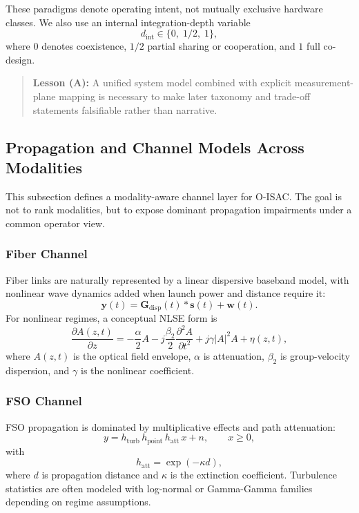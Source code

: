 These paradigms denote operating intent, not mutually exclusive hardware classes. We also use an internal integration-depth variable
\begin{equation}
d_{\text{int}}\in\{0,\;1/2,\;1\},
\end{equation}
where $0$ denotes coexistence, $1/2$ partial sharing or cooperation, and $1$ full co-design.

\begin{quote}
\textbf{Lesson (A):} A unified system model combined with explicit measurement-plane mapping is necessary to make later taxonomy and trade-off statements falsifiable rather than narrative.
\end{quote}

\subsection{Propagation and Channel Models Across Modalities}
This subsection defines a modality-aware channel layer for O-ISAC. The goal is not to rank modalities, but to expose dominant propagation impairments under a common operator view.

\subsubsection{Fiber Channel}
Fiber links are naturally represented by a linear dispersive baseband model, with nonlinear wave dynamics added when launch power and distance require it:
\begin{equation}
\mathbf{y}(t)=\mathbf{G}_{\text{disp}}(t)\ast \mathbf{s}(t)+\mathbf{w}(t).
\end{equation}
For nonlinear regimes, a conceptual NLSE form is
\begin{equation}
\frac{\partial A(z,t)}{\partial z}= -\frac{\alpha}{2}A - j\frac{\beta_2}{2}\frac{\partial^2 A}{\partial t^2} + j\gamma|A|^2A + \eta(z,t),
\end{equation}
where $A(z,t)$ is the optical field envelope, $\alpha$ is attenuation, $\beta_2$ is group-velocity dispersion, and $\gamma$ is the nonlinear coefficient.

\subsubsection{FSO Channel}
FSO propagation is dominated by multiplicative effects and path attenuation:
\begin{equation}
y = h_{\text{turb}}\,h_{\text{point}}\,h_{\text{att}}\,x + n,\qquad x\ge 0,
\end{equation}
with
\begin{equation}
h_{\text{att}}=\exp(-\kappa d),
\end{equation}
where $d$ is propagation distance and $\kappa$ is the extinction coefficient. Turbulence statistics are often modeled with log-normal or Gamma-Gamma families depending on regime assumptions.

